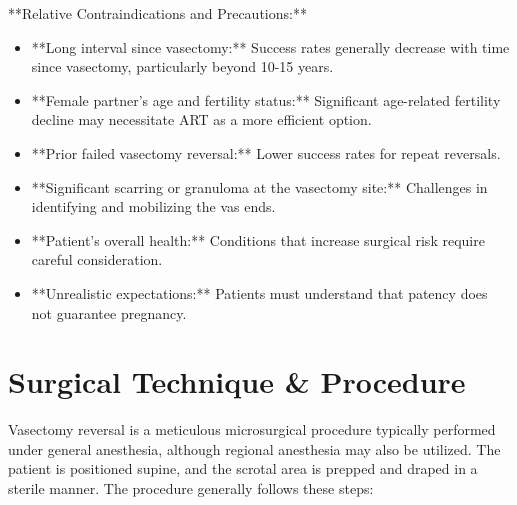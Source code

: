 **Relative Contraindications and Precautions:**
\begin{itemize}
  \item **Long interval since vasectomy:** Success rates generally decrease with time since vasectomy, particularly beyond 10-15 years.
  \item **Female partner's age and fertility status:** Significant age-related fertility decline may necessitate ART as a more efficient option.
  \item **Prior failed vasectomy reversal:** Lower success rates for repeat reversals.
  \item **Significant scarring or granuloma at the vasectomy site:** Challenges in identifying and mobilizing the vas ends.
  \item **Patient's overall health:** Conditions that increase surgical risk require careful consideration.
  \item **Unrealistic expectations:** Patients must understand that patency does not guarantee pregnancy.
\end{itemize}

\section*{Surgical Technique \& Procedure}
Vasectomy reversal is a meticulous microsurgical procedure typically performed under general anesthesia, although regional anesthesia may also be utilized. The patient is positioned supine, and the scrotal area is prepped and draped in a sterile manner. The procedure generally follows these steps:

